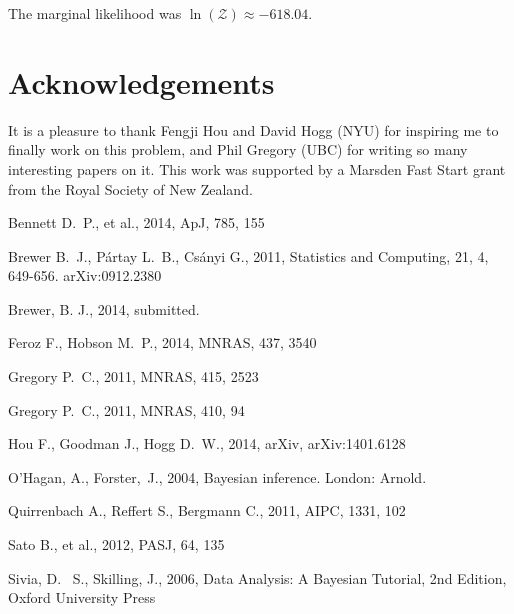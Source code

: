 \documentclass[useAMS,usenatbib]{mn2e}
\begin{document}
The marginal likelihood was $\ln(\mathcal{Z}) \approx -618.04$.

\vspace{-0.5cm}
\section*{Acknowledgements}
It is a pleasure to thank Fengji Hou and David Hogg (NYU) for inspiring me to
finally work on this problem, and Phil Gregory (UBC) for writing so many
interesting papers on it. This work was supported by a Marsden Fast Start
grant from the Royal Society of
New Zealand.

\begin{thebibliography}{99}

 Bennett D.~P., et al., 2014, ApJ, 785, 155 

 Brewer B.~J., P{\'a}rtay L.~B., Cs{\'a}nyi G., 2011,
Statistics and Computing, 21, 4, 649-656. arXiv:0912.2380

 Brewer, B. J., 2014,
submitted.

 Feroz F., Hobson M.~P., 2014, MNRAS, 437, 3540 

Gregory P.~C., 2011, MNRAS, 415, 2523 

Gregory P.~C., 2011, MNRAS, 410, 94 

 Hou F., Goodman J., Hogg D.~W., 2014, arXiv, arXiv:1401.6128 

O'Hagan, A., Forster,~J., 2004, Bayesian inference. London: Arnold.

 Quirrenbach A., Reffert S., Bergmann C., 2011, AIPC, 1331, 102 

Sato B., et al., 2012, PASJ, 64, 135 

 Sivia, 
D.~ S., Skilling, J., 2006, Data Analysis: A Bayesian Tutorial, 2nd 
Edition, Oxford University Press


\end{thebibliography}
\end{document}
